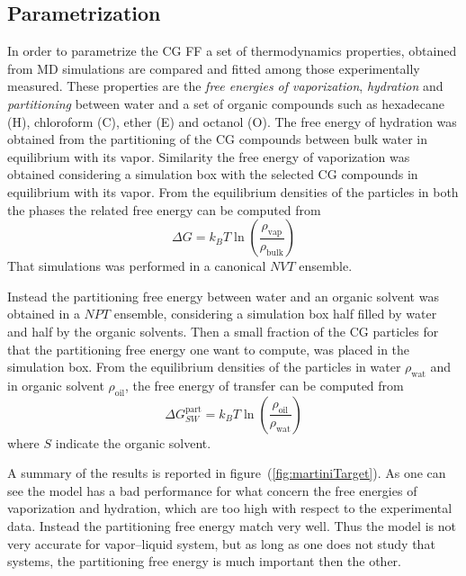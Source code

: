\subsection{Parametrization}
In order to parametrize the \martini \ac{CG} \ac{FF} a set of thermodynamics properties, obtained from \ac{MD} simulations are compared and fitted among those experimentally measured. These properties are the \textit{free energies of vaporization}, \textit{hydration} and \textit{partitioning} between water and a set of organic compounds such as hexadecane (H), chloroform (C), ether (E) and octanol (O). The free energy of hydration was obtained from the partitioning of the \ac{CG} compounds between bulk water in equilibrium with its vapor. Similarity the free energy of vaporization was obtained considering a simulation box with the selected \ac{CG} compounds in equilibrium with its vapor. From the equilibrium densities of the particles in both the phases the related free energy can be computed from
\begin{equation*}
	\Delta G = k_B T\ln \left ( \frac{\rho_{\text{vap}}}{\rho_{\text{bulk}}} \right )
\end{equation*}
That simulations was performed in a canonical $NVT$ ensemble.

Instead the partitioning free energy between water and an organic solvent was obtained in a $NPT$ ensemble, considering a simulation box half filled by water and half by the organic solvents. Then a small fraction of the \ac{CG} particles for that the partitioning free energy one want to compute, was placed in the simulation box. From the equilibrium densities of the particles in water $\rho_{\text{wat}}$ and in organic solvent $\rho_{\text{oil}}$, the free energy of transfer can be computed from
\begin{equation*}
	\Delta G_{SW}^{\text{part}} = k_B T \ln \left ( \frac{\rho_{\text{oil}}}{\rho_{\text{wat}}}\right )
\end{equation*}
where $S$ indicate the organic solvent.

A summary of the results is reported in figure~(\ref{fig:martiniTarget}). As one can see the model has a bad performance for what concern the free energies of vaporization and hydration, which are too high with respect to the experimental data. Instead the partitioning free energy match very well. Thus the model is not very accurate for vapor--liquid system, but as long as one does not study that systems, the partitioning free energy is much important then the other.

